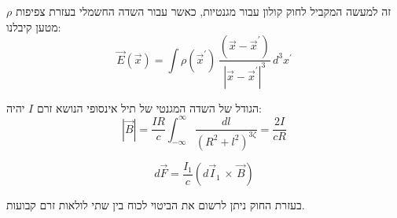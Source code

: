 \documentclass{tstextbook}
\begin{document}
\begin{remark}
זה למעשה המקביל לחוק קולון עבור מגנטיות, כאשר עבור השדה החשמלי בעזרת צפיפות \(\rho\) מטען קיבלנו:
$$\vec{E}(\vec{x})=\!\int\!\rho(\vec{x}^{\prime})\,{\frac{(\vec{x}-\vec{x}^{\prime})}{|\vec{x}-\vec{x}^{\prime}|^{3}}}\,d^{3}x^{\prime}$$

\end{remark}
\begin{example}
הגודל של השדה המגנטי של תיל אינסופי הנושא זרם \(I\) יהיה:
$$|\vec{B}|={\frac{I R}{c}}\!\!\int_{-\infty}^{\infty}\!{\frac{d l}{(R^{2}+l^{2})^{3\zeta}}}={\frac{2I}{c R}}$$

\end{example}
\begin{proposition}
$$d\vec{F}={\frac{I_{1}}{c}}\left(d\vec{I}_{1}\,\times\,\vec{B}\right)$$

\end{proposition}
בעזרת החוק ניתן לרשום את הביטוי לכוח בין שתי לולאות זרם קבועות. 
\end{document}
